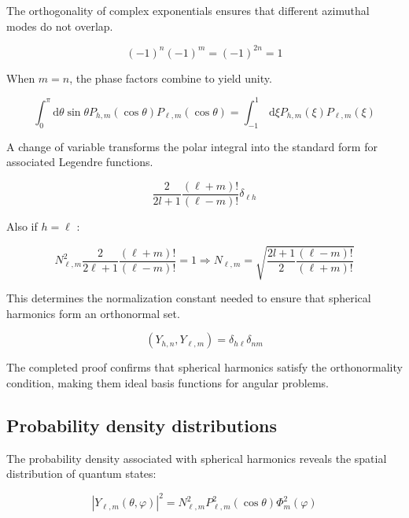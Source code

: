\documentclass[italian]{HKNdocument}
\begin{document}
The orthogonality of complex exponentials ensures that different azimuthal modes do not overlap.

\begin{equation}
(-1)^{n}(-1)^{m}=(-1)^{2 n}=1 \label{eq:8.54}
\end{equation}

When $m=n$, the phase factors combine to yield unity.

\begin{equation}
\int_{0}^{\pi} \mathrm{d} \theta \sin \theta P_{h, m}(\cos \theta) P_{\ell, m}(\cos \theta)=\int_{-1}^{1} \, \mathrm{d} \xi P_{h, m}(\xi) P_{\ell, m}(\xi) \label{eq:8.55}
\end{equation}

A change of variable transforms the polar integral into the standard form for associated Legendre functions.

\begin{equation}
\frac{2}{2 l+1} \frac{(\ell+m)!}{(\ell-m)!} \delta_{\ell h} \label{eq:8.56}
\end{equation}

Also if $h=\ell$ :

\begin{equation}
N_{\ell, m}^{2} \frac{2}{2 \ell+1} \frac{(\ell+m)!}{(\ell-m)!}=1 \Longrightarrow N_{\ell, m}=\sqrt{\frac{2 l+1}{2} \frac{(\ell-m)!}{(\ell+m)!}} \label{eq:8.57}
\end{equation}

This determines the normalization constant needed to ensure that spherical harmonics form an orthonormal set.

\begin{equation}
\left(Y_{h, n}, Y_{\ell, m}\right)=\delta_{h \ell} \delta_{n m} \label{eq:8.58}
\end{equation}

The completed proof confirms that spherical harmonics satisfy the orthonormality condition, making them ideal basis functions for angular problems.

\subsection{Probability density distributions}
The probability density associated with spherical harmonics reveals the spatial distribution of quantum states:

\begin{equation}
\left|Y_{\ell, m}(\theta, \varphi)\right|^{2}=N_{\ell, m}^{2} P_{\ell, m}^{2}(\cos \theta) \Phi_{m}^{2}(\varphi) \label{eq:8.59}
\end{equation}
\end{document}
